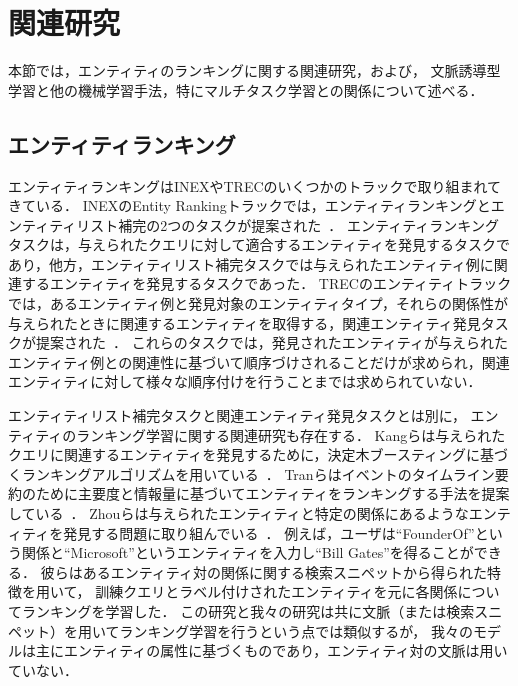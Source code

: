 \chapter{関連研究}
\label{sq:RelatedWork}
本節では，エンティティのランキングに関する関連研究，および，
文脈誘導型学習と他の機械学習手法，特にマルチタスク学習との関係について述べる．

\section{エンティティランキング}
エンティティランキングはINEXやTRECのいくつかのトラックで取り組まれてきている．
INEXのEntity Rankingトラックでは，エンティティランキングとエンティティリスト補完の2つのタスクが提案された~\cite{de2007overview,demartini2008overview,demartini2009overview}．
エンティティランキングタスクは，与えられたクエリに対して適合するエンティティを発見するタスクであり，他方，エンティティリスト補完タスクでは与えられたエンティティ例に関連するエンティティを発見するタスクであった．
TRECのエンティティトラックでは，あるエンティティ例と発見対象のエンティティタイプ，それらの関係性が与えられたときに関連するエンティティを取得する，関連エンティティ発見タスクが提案された~\cite{balog2009overview,balog2010overview,balog2011overview}．
これらのタスクでは，発見されたエンティティが与えられたエンティティ例との関連性に基づいて順序づけされることだけが求められ，関連エンティティに対して様々な順序付けを行うことまでは求められていない．

エンティティリスト補完タスクと関連エンティティ発見タスクとは別に，
エンティティのランキング学習に関する関連研究も存在する．
Kangらは与えられたクエリに関連するエンティティを発見するために，決定木ブースティングに基づくランキングアルゴリズムを用いている~\cite{kang2015learning}．
Tranらはイベントのタイムライン要約のために主要度と情報量に基づいてエンティティをランキングする手法を提案している~\cite{tran2015balancing}．
Zhouらは与えられたエンティティと特定の関係にあるようなエンティティを発見する問題に取り組んでいる~\cite{zhou2013learning}．
例えば，ユーザは``FounderOf''という関係と``Microsoft''というエンティティを入力し``Bill Gates''を得ることができる．
彼らはあるエンティティ対の関係に関する検索スニペットから得られた特徴を用いて，
訓練クエリとラベル付けされたエンティティを元に各関係についてランキングを学習した．
この研究と我々の研究は共に文脈（または検索スニペット）を用いてランキング学習を行うという点では類似するが，
我々のモデルは主にエンティティの属性に基づくものであり，エンティティ対の文脈は用いていない．

